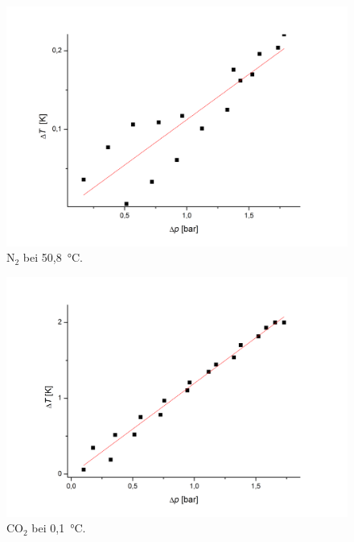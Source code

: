 \documentclass[a4paper,12pt,oneside,onecolum,final,openany]{report}
\begin{document}
\begin{center}
\begin{figure}[h]
\includegraphics[width=13.5cm]{N2bei50.png}
\caption{$\mathrm{N}_2$ bei 50,8~°C.}
\end{figure}
\end{center}
\begin{center}
\begin{figure}[h]
\includegraphics[width=13.5cm]{CO2bei0.png}
\caption{$\mathrm{CO}_2$ bei 0,1~°C.}
\end{figure}
\end{center}
\end{document}
